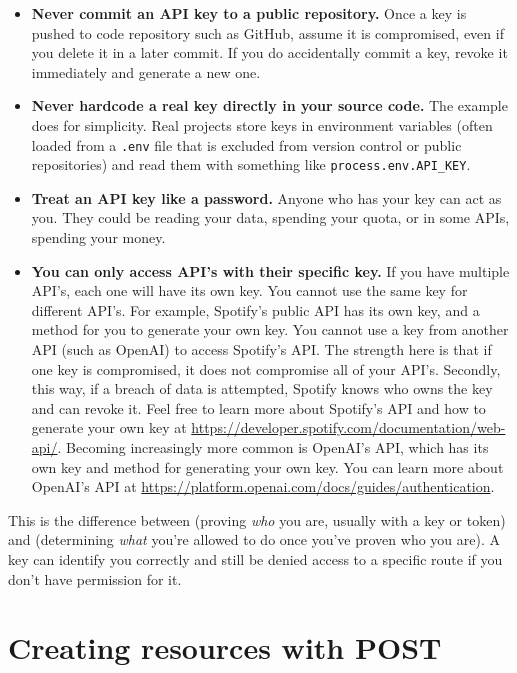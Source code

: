 \begin{itemize}
  \item \textbf{Never commit an API key to a public repository.} Once a
        key is pushed to code repository such as GitHub, assume it is compromised, even if you
        delete it in a later commit. If you do accidentally commit a key, revoke it immediately and generate a new one.
  \item \textbf{Never hardcode a real key directly in your source code.} The example does for simplicity. Real projects store keys in environment variables (often loaded from a \texttt{.env}
        file that is excluded from version control or public repositories) and read them with
        something like \texttt{process.env.API\_KEY}.
  \item \textbf{Treat an API key like a password.} Anyone who has your
        key can act as you. They could be reading your data, spending your quota, or
        in some APIs, spending your money.
  \item \textbf{You can only access API's with their specific key.} If you have multiple API's, each one will have its own key. You cannot use the same key for different API's. For example, Spotify's public API has its own key, and a method for you to generate your own key. You cannot use a key from another API (such as OpenAI) to access Spotify's API. The strength here is that if one key is compromised, it does not compromise all of your API's. Secondly, this way, if a breach of data is attempted, Spotify knows who owns the key and can revoke it. Feel free to learn more about Spotify's API and how to generate your own key at \url{https://developer.spotify.com/documentation/web-api/}. Becoming increasingly more common is OpenAI's API, which has its own key and method for generating your own key. You can learn more about OpenAI's API at \url{https://platform.openai.com/docs/guides/authentication}.
\end{itemize}

This is the difference between  (proving
\emph{who} you are, usually with a key or token) and
 (determining \emph{what} you're allowed to do
once you've proven who you are). A key can identify you correctly and
still be denied access to a specific route if you don't have
permission for it.

\section{Creating resources with POST}

